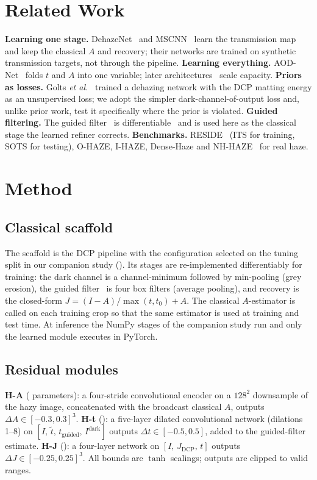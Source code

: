 \documentclass[conference]{IEEEtran}
\begin{document}
\section{Related Work}
\textbf{Learning one stage.} DehazeNet~\cite{cai2016} and MSCNN~\cite{ren2016} learn the transmission map and keep the
classical $A$ and recovery; their networks are trained on synthetic transmission targets, not through the pipeline.
\textbf{Learning everything.} AOD-Net~\cite{li2017} folds $t$ and $A$ into one variable; later
architectures~\cite{qin2020,song2023} scale capacity. \textbf{Priors as losses.} Golts \emph{et al.}~\cite{golts2020}
trained a dehazing network with the DCP matting energy as an unsupervised loss; we adopt the simpler
dark-channel-of-output loss and, unlike prior work, test it specifically where the prior is violated. \textbf{Guided
filtering.} The guided filter~\cite{he2010} is differentiable~\cite{wu2018} and is used here as the classical stage the
learned refiner corrects. \textbf{Benchmarks.} RESIDE~\cite{li2019} (ITS for training, SOTS for testing), O-HAZE,
I-HAZE, Dense-Haze and NH-HAZE~\cite{ancuti2018o,ancuti2018i,ancuti2019,ancuti2020} for real haze.

\section{Method}
\subsection{Classical scaffold}
The scaffold is the DCP pipeline with the configuration selected on the tuning split in our companion study
(\emph{\tunedCfg}). Its stages are re-implemented differentiably for training: the dark channel is a channel-minimum
followed by min-pooling (grey erosion), the guided filter~\cite{he2010} is four box filters (average pooling), and
recovery is the closed-form $J = (I - A)/\max(t, t_0) + A$. The classical $A$-estimator is called on each training
crop so that the same estimator is used at training and test time. At inference the NumPy stages of the companion
study run and only the learned module executes in PyTorch.

\subsection{Residual modules}
\textbf{H-A} (\hybHAParams{} parameters): a four-stride convolutional encoder on a $128^2$ downsample of the hazy image,
concatenated with the broadcast classical $A$, outputs $\Delta A\in[-0.3,0.3]^3$.
\textbf{H-t} (\hybHTsupParams{}): a five-layer dilated convolutional network (dilations 1--8) on
$[I,\,\tilde t,\,t_{\text{guided}},\,I^{\text{dark}}]$ outputs $\Delta t\in[-0.5,0.5]$, added to the guided-filter
estimate.
\textbf{H-J} (\hybHJParams{}): a four-layer network on $[I,\,J_{\text{DCP}},\,t]$ outputs $\Delta J\in[-0.25,0.25]^3$.
All bounds are $\tanh$ scalings; outputs are clipped to valid ranges.
\end{document}
